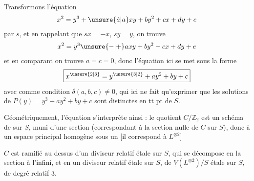 
Transformons l'équation
\[
x^2=y^3+\unsure{\dot a|a}xy+by^2+cx+dy+e
\]
par $s$, et en rappelant que $sx=-x$, $sy=y$, on trouve
\[
x^2=y^3\unsure{-|+}axy+by^2-cx+dy+e
\]
et en comparant on trouve $a=c=0$, donc l'équation ici se met sous la forme
\[
\boxed{x^{\unsure{2|3}}=y^{\unsure{3|2}}+ay^2+by+c}
\]
avec comme condition $\delta(a,b,c)\neq0$, qui ici ne fait qu'exprimer que les solutions de $P(y)=y^3+ay^2+by+c$ sont distinctes en tt pt de $S$.

Géométriquement,  l'équation s'interprète ainsi : le quotient $C/\mathbb Z_2$ est un schéma de   sur $S$, muni d'une section  (correspondant à la section nulle de $C$ sur $S$), donc    à un espace principal homogène sous un     [il correspond à $L^{\otimes2}$]

$C$ est ramifié  au dessus d'un diviseur relatif  étale sur $S$, qui se décompose en la section à l'infini, et en un diviseur relatif  étale sur $S$,  de  $\underline V(L^{\otimes2})/S$ étale sur $S$, de degré relatif $3$.
